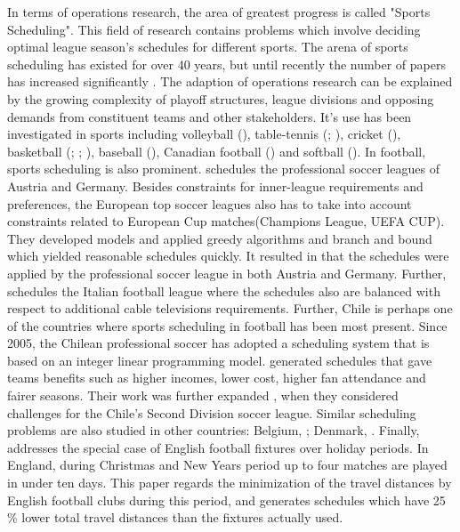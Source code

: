 \newpar

In terms of operations research, the area of greatest progress is called "Sports Scheduling". This field of research contains problems which involve deciding optimal league season's schedules for different sports. The arena of sports scheduling has existed for over 40 years, but until recently the number of papers has increased significantly \citep{Kendall}. The adaption of operations research can be explained by the growing complexity of playoff structures, league divisions and opposing demands from constituent teams and other stakeholders.  It's use has been investigated in sports including volleyball (\cite{arg_volleyball}), table-tennis (\cite{Mattfeld}; \cite{Knust}), cricket (\cite{Mwright}), basketball (\cite{Wright}; \cite{van_Voorhis}; \cite{Henz}), baseball (\cite{Trick}), Canadian football (\cite{Kostuk}) and softball (\cite{Saur}). In football, sports scheduling is also prominent. \cite{Bartsch} schedules the professional soccer leagues of Austria and Germany. Besides constraints for inner-league requirements and preferences, the European top soccer leagues also has to take into account constraints related to European Cup matches(Champions League, UEFA CUP). They developed models and applied greedy algorithms and branch and bound which yielded reasonable schedules quickly. It resulted in that the schedules were applied by the professional soccer league in both Austria and Germany. Further, \cite{Della} schedules the Italian football league where the schedules also are balanced with respect to additional cable televisions requirements. Further, Chile is perhaps one of the countries where sports scheduling in football has been most present. Since 2005, the Chilean professional soccer has adopted a scheduling system that is based on an integer linear programming model. \cite{Guajardo} generated schedules that gave teams benefits such as higher incomes, lower cost, higher fan attendance and fairer seasons.  Their work was further expanded \citep{Duran}, when they considered challenges for the Chile's Second Division soccer league. Similar scheduling problems are also studied in other countries: Belgium, \cite{Goossens}; Denmark, \cite{Rasmussen}. Finally, \cite{Kendall} addresses the special case of English football fixtures over holiday periods. In England, during Christmas and New Years period up to four matches are played in under ten days. This paper regards the minimization of the travel distances by English football clubs during this period, and generates schedules which have 25 \% lower total travel distances than the fixtures actually used. 




